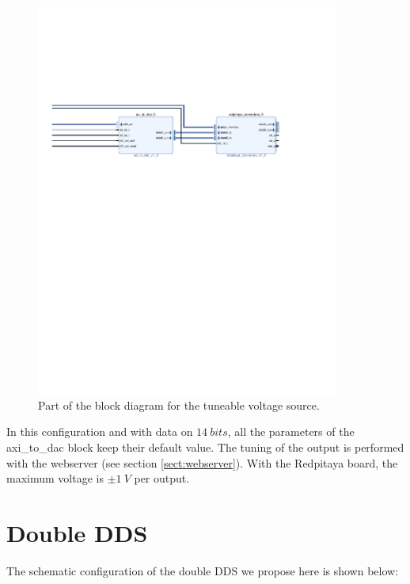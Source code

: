 \documentclass[12pt,oneside]{article}
\begin{document}
\begin{figure}[h!tb]
	\begin{center}
		\includegraphics[width=10cm,trim={4.5cm 16cm 3.5cm 7cm}, clip]{figures/GeneTension.pdf}
		\caption{Part of the block diagram for the tuneable voltage source.}
		\label{fig:geneTension}
	\end{center}
\end{figure}

In this configuration and with data on $14~bits$, all the parameters of the axi\_to\_dac block keep their default value. The tuning of the output is performed with the webserver (see section \ref{sect:webserver}). With the Redpitaya board, the maximum voltage is $\pm 1~V$ per output.

\section{Double DDS}

The schematic configuration of the double DDS we propose here is shown below: 
\end{document}
